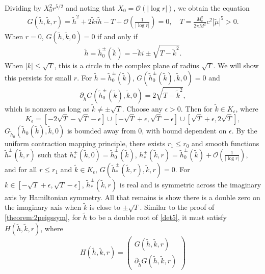 \documentclass[10pt,reqno]{amsart}
\theoremstyle{plain}
\theoremstyle{definition}
\theoremstyle{remark}
\numberwithin{theorem}{section}
\numberwithin{equation}{section}
\begin{document}
Dividing by $X_0^2 r^{5/2}$ and noting that $X_0 = \mathcal{O}(|\log r|)$, we obtain the equation
\begin{equation}\label{det5}
\begin{aligned}
G(\tilde{h}, \tilde{k}, r) = \tilde{h}^2 + 2 \tilde{k}  i \tilde{h}
- T + \mathcal{O}\left( \frac{1}{|\log r|} \right) = 0, \quad T = \frac{M_c^2 }{2 \pi M^2 } c^2 |\tilde{\mu}|^5 > 0.
\end{aligned}
\end{equation}
When $r = 0$, $G(\tilde{h}, \tilde{k}, 0) = 0$ if and only if 
\begin{equation}
\tilde{h} = \tilde{h}_0^\pm(\tilde{k}) = -\tilde{k}i \pm \sqrt{T - \tilde{k}^2}.
\end{equation}
When $|k| \leq \sqrt{T}$, this is a circle in the complex plane of radius $\sqrt{T}$. We will show this persists for small $r$. For $\tilde{h} = \tilde{h}_0^\pm(\tilde{k})$, $G(\tilde{h}_0^\pm(\tilde{k}), \tilde{k}, 0) = 0$ and
\begin{equation}
\partial_{\tilde{h}}G(\tilde{h}_0^\pm(\tilde{k}), \tilde{k}, 0) = 2 \sqrt{T - \tilde{k}^2},
\end{equation}
which is nonzero as long as $\tilde{k} \neq \pm \sqrt{T}$. Choose any $\epsilon > 0$. Then for $\tilde{k} \in K_\epsilon$, where
\[
K_\epsilon = [-2 \sqrt{T} -\sqrt{T} - \epsilon]
\cup [-\sqrt{T} + \epsilon, \sqrt{T} - \epsilon]
\cup [\sqrt{T} + \epsilon, 2\sqrt{T}],
\]
$G_{\tilde{h}_0}(\tilde{h}_0(\tilde{k}), \tilde{k}, 0)$ is bounded away from 0, with bound dependent on $\epsilon$. By the uniform contraction mapping principle, there exists $r_1 \leq r_0$ and smooth functions $\tilde{h}_*^\pm(\tilde{k}, r)$ such that $h_*^\pm(\tilde{k}, 0) = \tilde{h}_0^\pm(\tilde{k})$, $h_*^\pm(\tilde{k}, r) = \tilde{h}_0^\pm(\tilde{k}) + \mathcal{O}(\frac{1}{|\log r|})$, and for all $r \leq r_1$ and $\tilde{k} \in K_\epsilon$, $G(\tilde{h}_*^\pm(\tilde{k},r),\tilde{k},r) = 0$. For $k \in [-\sqrt{T} + \epsilon, \sqrt{T} - \epsilon]$, $\tilde{h}_*^\pm(\tilde{k}, r)$ is real and is symmetric across the imaginary axis by Hamiltonian symmetry. All that remains is show there is a double zero on the imaginary axis when $\tilde{k}$ is close to $\pm \sqrt{T}$. Similar to the proof of \cref{theorem:2peigssym}, for $\tilde{h}$ to be a double root of \cref{det5}, it must satisfy $H(\tilde{h}, \tilde{k}, r)$, where
\[
H(\tilde{h}, \tilde{k}, r) = \begin{pmatrix} G(\tilde{h}, \tilde{k}, r) \\
\partial_{\tilde{h}} G(\tilde{h}, \tilde{k}, r) \end{pmatrix}
\]
\end{document}
